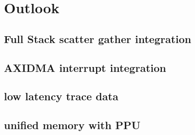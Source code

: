 \section{Outlook}
\subsection{Full Stack scatter gather integration}
\subsection{AXIDMA interrupt integration}
\subsection{low latency trace data}
\subsection{unified memory with PPU}

